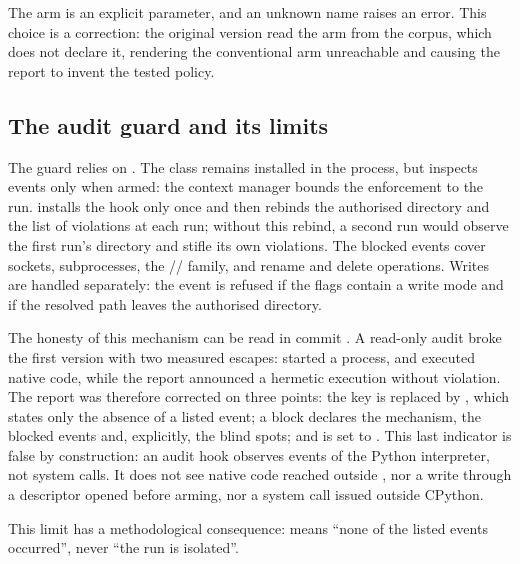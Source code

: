 The arm is an explicit parameter, and an unknown name raises an error. This choice
is a correction: the original version read the arm from the corpus, which does not
declare it, rendering the conventional arm unreachable and causing the report to
invent the tested policy.

\subsection{The audit guard and its limits}

The guard relies on . The  class remains
installed in the process, but inspects events only when armed: the
 context manager bounds the enforcement to the run.
 installs the hook only once and then rebinds the authorised
directory and the list of violations at each run; without this rebind, a second run
would observe the first run's directory and stifle its own violations. The blocked
events cover sockets, subprocesses, the //
family,  and rename and delete operations. Writes are handled
separately: the  event is refused if the flags contain a write mode and
if the resolved path leaves the authorised directory.

The honesty of this mechanism can be read in commit . A read-only
audit broke the first version with two measured escapes: 
started a process, and  executed native code,
while the report announced a hermetic execution without violation. The report was
therefore corrected on three points: the key  is replaced by
, which states only the absence of a listed event; a
 block declares the mechanism, the blocked events and, explicitly, the
blind spots; and  is set to . This last
indicator is false by construction: an audit hook observes events of the Python
interpreter, not system calls. It does not see native code reached outside
, nor a write through a descriptor opened before arming, nor a system
call issued outside CPython.

This limit has a methodological consequence:  means
``none of the listed events occurred'', never ``the run is isolated''.

